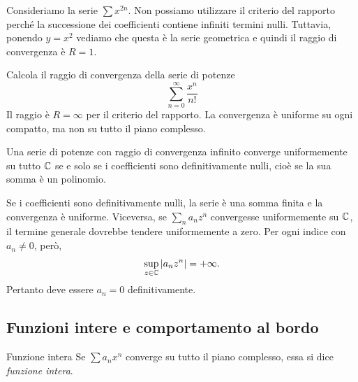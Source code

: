 \documentclass[a4paper]{article}
\begin{document}
\begin{radioactive}
\begin{snippetexample}{}
    Consideriamo la serie \(\sum x^{2n}\).
    Non possiamo utilizzare il criterio del rapporto
    perché la successione dei coefficienti contiene infiniti termini nulli.
    Tuttavia,
    ponendo \(y = x^2\) vediamo che questa è la serie geometrica e quindi il raggio di
    convergenza è \(R=1\).
\end{snippetexample}
\end{radioactive}

\begin{radioactive}
\begin{snippetexample}{}
    Calcola il raggio di convergenza della serie di potenze
    \[
        \sum_{n=0}^\infty\frac{x^n}{n!}
    \]
    Il raggio è \(R=\infty\) per il criterio del rapporto.
    La convergenza è uniforme su ogni compatto, ma non su tutto il piano complesso.
\end{snippetexample}
\end{radioactive}

\begin{radioactive}
\begin{snippetproposition}{}
    Una serie di potenze con raggio di convergenza infinito converge uniformemente
    su tutto \(\mathbb{C}\) se e solo se i coefficienti sono definitivamente nulli,
    cioè se la sua somma è un polinomio.
\end{snippetproposition}
\end{radioactive}

\begin{radioactive}
\begin{snippetproof}{}
    Se i coefficienti sono definitivamente nulli, la serie è una somma finita e la
    convergenza è uniforme. Viceversa, se \(\sum_n a_nz^n\) convergesse uniformemente
    su \(\mathbb{C}\), il termine generale dovrebbe tendere uniformemente a zero.
    Per ogni indice con \(a_n\neq0\), però,
    \[
        \sup_{z\in\mathbb{C}}|a_nz^n|=+\infty.
    \]
    Pertanto deve essere \(a_n=0\) definitivamente.
\end{snippetproof}
\end{radioactive}

\subsection{Funzioni intere e comportamento al bordo}

\begin{radioactive}
\begin{snippetdefinition}{Funzione intera}
    Se \(\sum a_nx^n\) converge su tutto il piano complesso, essa si dice
    \emph{funzione intera}.
\end{snippetdefinition}
\end{radioactive}
\end{document}
